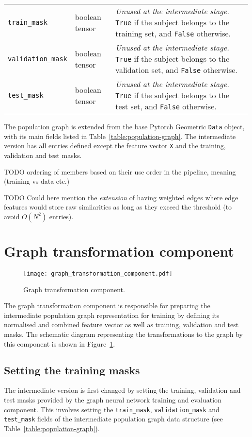 \begin{center}
\begin{longtable}[]{lp{}p{}}
    \texttt{train\_mask} & boolean tensor & \textit{Unused at the intermediate stage.} \texttt{True} if the subject belongs to the training set, and \texttt{False} otherwise. \\
    \texttt{validation\_mask} & boolean tensor & \textit{Unused at the intermediate stage.} \texttt{True} if the subject belongs to the validation set, and \texttt{False} otherwise. \\
    \texttt{test\_mask} & boolean tensor & \textit{Unused at the intermediate stage.} \texttt{True} if the subject belongs to the test set, and \texttt{False} otherwise.
\end{longtable}
\end{center}

The population graph is extended from the base Pytorch Geometric \texttt{Data} object, with its main fields listed in Table~\ref{table:population-graph}. The intermediate version has all entries defined except the feature vector \texttt{X} and the training, validation and test masks.

TODO ordering of members based on their use order in the pipeline, meaning (training vs data etc.)

TODO Could here mention the \textit{extension} of having weighted edges where edge features would store raw similarities as long as they exceed the threshold (to avoid $O(N^2)$ entries).


\section{Graph transformation component}

\begin{figure}[h]
    \centering
    \texttt{[image: graph\_transformation\_component.pdf]}
    \caption{Graph transformation component.}\label{graph-transformation-component}
\end{figure}

The graph transformation component is responsible for preparing the intermediate population graph representation for training by defining its normalised and combined feature vector as well as training, validation and test masks. The schematic diagram representing the transformations to the graph by this component is shown in Figure~\ref{graph-transformation-component}.

\subsection{Setting the training masks}
The intermediate version is first changed by setting the training, validation and test masks provided by the graph neural network training and evaluation component. This involves setting the \texttt{train\_mask}, \texttt{validation\_mask} and \texttt{test\_mask} fields of the intermediate population graph data structure (see Table~\ref{table:population-graph}). 

